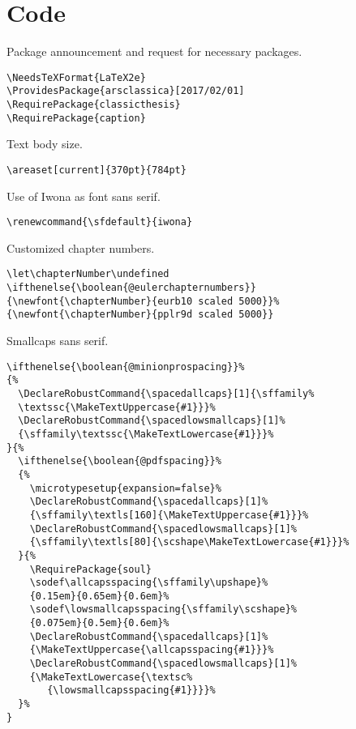 
\chapter{Code}
\label{chp:code}
 
\lstset{numbers=left,
    numberstyle=\scriptsize,
    stepnumber=1,
    numbersep=8pt
}    



Package announcement and request for necessary packages.
\begin{lstlisting}[firstnumber=1]
\NeedsTeXFormat{LaTeX2e}
\ProvidesPackage{arsclassica}[2017/02/01]
\RequirePackage{classicthesis}
\RequirePackage{caption}
\end{lstlisting}



Text body size.
\begin{lstlisting}
\areaset[current]{370pt}{784pt}
\end{lstlisting}



Use of Iwona as font sans serif.
\begin{lstlisting}
\renewcommand{\sfdefault}{iwona}
\end{lstlisting}



Customized chapter numbers.
\begin{lstlisting}
\let\chapterNumber\undefined 
\ifthenelse{\boolean{@eulerchapternumbers}}
{\newfont{\chapterNumber}{eurb10 scaled 5000}}% 
{\newfont{\chapterNumber}{pplr9d scaled 5000}}
\end{lstlisting}



Smallcaps sans serif.
\begin{lstlisting}
\ifthenelse{\boolean{@minionprospacing}}%
{%
  \DeclareRobustCommand{\spacedallcaps}[1]{\sffamily%
  \textssc{\MakeTextUppercase{#1}}}%
  \DeclareRobustCommand{\spacedlowsmallcaps}[1]%
  {\sffamily\textssc{\MakeTextLowercase{#1}}}%
}{%
  \ifthenelse{\boolean{@pdfspacing}}%
  {%
    \microtypesetup{expansion=false}%
    \DeclareRobustCommand{\spacedallcaps}[1]%
    {\sffamily\textls[160]{\MakeTextUppercase{#1}}}%
    \DeclareRobustCommand{\spacedlowsmallcaps}[1]%
    {\sffamily\textls[80]{\scshape\MakeTextLowercase{#1}}}%
  }{%
    \RequirePackage{soul} 
    \sodef\allcapsspacing{\sffamily\upshape}%
    {0.15em}{0.65em}{0.6em}%
    \sodef\lowsmallcapsspacing{\sffamily\scshape}%
    {0.075em}{0.5em}{0.6em}%   
    \DeclareRobustCommand{\spacedallcaps}[1]%
    {\MakeTextUppercase{\allcapsspacing{#1}}}%   
	\DeclareRobustCommand{\spacedlowsmallcaps}[1]%
	{\MakeTextLowercase{\textsc%
	   {\lowsmallcapsspacing{#1}}}}%
  }%
}
\end{lstlisting}



